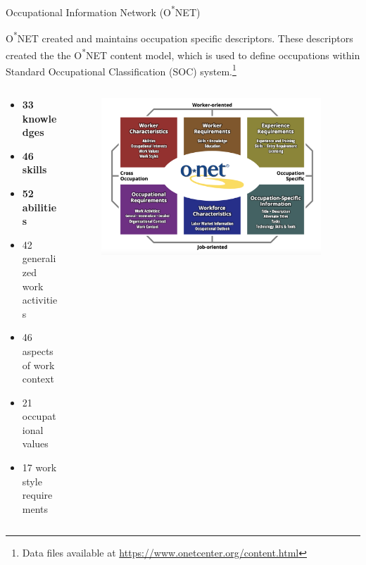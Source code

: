 \documentclass{beamer}
\begin{document}
\begin{frame}{Occupational Information Network (O\textsuperscript{*}NET)}

  O\textsuperscript{*}NET created and maintains occupation specific descriptors. These descriptors created the the O\textsuperscript{*}NET content model, which is used to define occupations within Standard Occupational Classification (SOC) system.\footnote{Data files available at \href{https://www.onetcenter.org/content.html}{https://www.onetcenter.org/content.html}}
  \begin{columns}
    \begin{column}{0.4\textwidth}
      \begin{itemize}
        \item \textbf{33 knowledges}\cite{knowledges}
        \item \textbf{46 skills}\cite{skills}
        \item \textbf{52 abilities}\cite{abilities}
        \item 42 generalized work activities
        \item 46 aspects of work context
        \item 21 occupational values
        \item 17 work style requirements
      \end{itemize}
    \end{column}
    \begin{column}{0.6\textwidth}
      \begin{figure}[ht!]
        \centering
        \includegraphics[width=0.95\textwidth]{images/onet.png}
      \end{figure}
    \end{column}
  \end{columns}
\end{frame}
\end{document}
